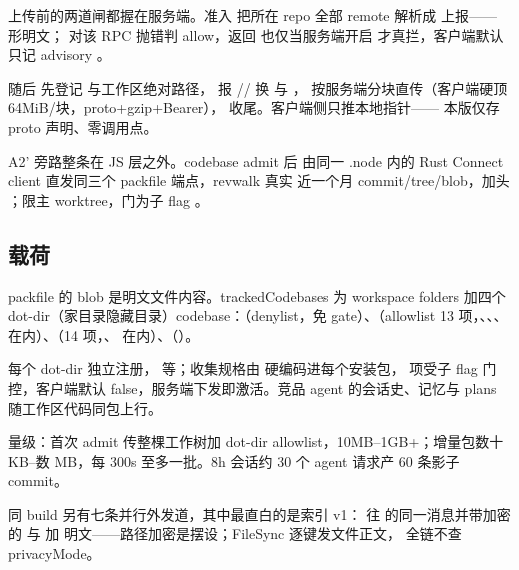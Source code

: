 上传前的两道闸都握在服务端。准入  把所在 repo 全部 remote 解析成  上报—— 形明文； 对该 RPC 抛错判 allow，返回  也仅当服务端开启  才真拦，客户端默认只记 advisory 。

随后  先登记  与工作区绝对路径， 报 // 换  与 ， 按服务端分块直传（客户端硬顶 64MiB/块，proto+gzip+Bearer）， 收尾。客户端侧只推本地指针—— 本版仅存 proto 声明、零调用点。

A2' 旁路整条在 JS 层之外。codebase admit 后  由同一 .node 内的 Rust Connect client 直发同三个 packfile 端点，revwalk 真实  近一个月 commit/tree/blob，加头 ；限主 worktree，门为子 flag 。

\subsection{载荷}

packfile 的 blob 是明文文件内容。trackedCodebases 为 workspace folders 加四个 dot-dir（家目录隐藏目录）codebase：（denylist，免 gate）、（allowlist 13 项，、、、 在内）、（14 项，、 在内）、（）。

每个 dot-dir 独立注册， 等；收集规格由  硬编码进每个安装包， 项受子 flag  门控，客户端默认 false，服务端下发即激活。竞品 agent 的会话史、记忆与 plans 随工作区代码同包上行。

量级：首次 admit 传整棵工作树加 dot-dir allowlist，10MB--1GB+；增量包数十 KB--数 MB，每 300s 至多一批。8h 会话约 30 个 agent 请求产 60 条影子 commit。

同 build 另有七条并行外发道，其中最直白的是索引 v1： 往  的同一消息并带加密的  与  加  明文——路径加密是摆设；FileSync 逐键发文件正文， 全链不查 privacyMode。

